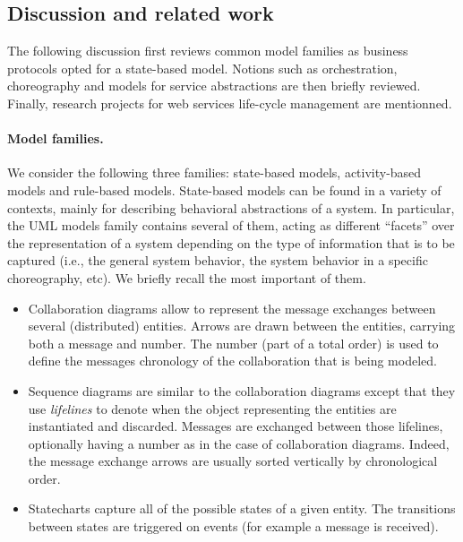 
\subsection{Discussion and related work}


The following discussion first reviews common model families as business protocols opted for a state-based model. Notions such as orchestration, choreography and models for service abstractions are then briefly reviewed. Finally, research projects for web services life-cycle management are mentionned.

\paragraph{Model families.}
We consider the following three families: state-based models, activity-based models and rule-based models. 
State-based models can be found in a variety of contexts, mainly for describing behavioral abstractions of a system. In particular, the UML models family \cite{UML} contains several of them, acting as different ``facets'' over the representation of a system depending on the type of information that is to be captured (i.e., the general system behavior, the system behavior in a specific choreography, etc). We briefly recall the most important of them.
\begin{itemize}

    \item Collaboration diagrams
    allow to represent the message exchanges between several (distributed) entities. Arrows are drawn between the entities, carrying both a message and number. The number (part of a total order) is used to define the messages chronology of the collaboration that is being modeled.

    \item Sequence diagrams
    are similar to the collaboration diagrams except that they use \emph{lifelines} to denote when the object representing the entities are instantiated and discarded. Messages are exchanged between those lifelines, optionally having a number as in the case of collaboration diagrams. Indeed, the message exchange arrows are usually sorted vertically by chronological order.

    \item Statecharts
    capture all of the possible states of a given entity. The transitions between states are triggered on events (for example a message is received).

\end{itemize}

